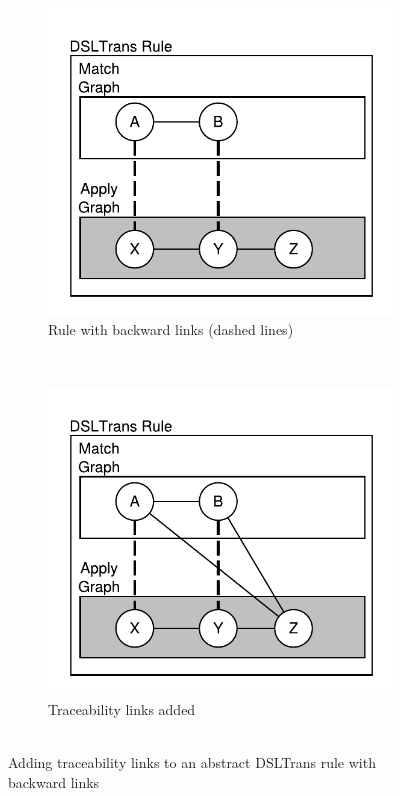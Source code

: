 \begin{figure}[htb]
        \centering
        \begin{subfigure}[b]{0.235\textwidth}
                \centering
                \includegraphics[width=1\textwidth]{./figures/building_path_conditions/backward_link.pdf}
                \caption{Rule with backward links (dashed lines)}
                \label{fig:backward_links}
        \end{subfigure}%
        ~~
        \begin{subfigure}[b]{0.235\textwidth}
                \centering
                \includegraphics[width=1\textwidth]{./figures/building_path_conditions/backward_link2.pdf}
                \caption{Traceability links added\\~}
                \label{fig:backward_links2}
        \end{subfigure}%
        \caption{Adding traceability links to an abstract DSLTrans rule with backward links}
        \label{fig:back_links}
\end{figure}

